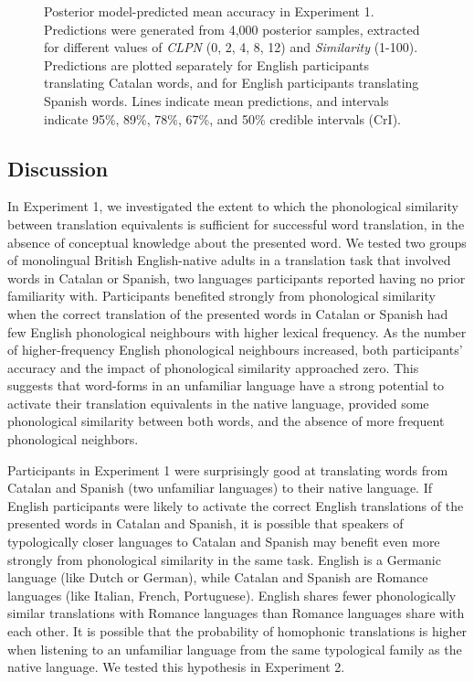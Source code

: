 \documentclass[
  man,
  longtable,
  nolmodern,
  notxfonts,
  notimes,
  colorlinks=true,linkcolor=blue,citecolor=blue,urlcolor=blue]{apa7}
\makeatletter
\newcommand*\pandocbounded[1]{%
  \sbox\pandoc@box{#1}%
  \Gscale@div\@tempa{\textheight}{\dimexpr\ht\pandoc@box+\dp\pandoc@box\relax}%
  \Gscale@div\@tempb{\linewidth}{\wd\pandoc@box}%
  \ifdim\@tempb\p@<\@tempa\p@\let\@tempa\@tempb\fi%
  \ifdim\@tempa\p@<\p@\scalebox{\@tempa}{\usebox\pandoc@box}%
  \else\usebox{\pandoc@box}%
  \fi%
}
\makeatother
\begin{document}
\begin{figure}

\caption{\label{fig-epreds-1}Posterior model-predicted mean accuracy in
Experiment 1. Predictions were generated from 4,000 posterior samples,
extracted for different values of \emph{CLPN} (0, 2, 4, 8, 12) and
\emph{Similarity} (1-100). Predictions are plotted separately for
English participants translating Catalan words, and for English
participants translating Spanish words. Lines indicate mean predictions,
and intervals indicate 95\%, 89\%, 78\%, 67\%, and 50\% credible
intervals (CrI).}

\centering{

\pandocbounded{\texttt{[image: manuscript\_files/figure-pdf/fig-epreds-1-1.pdf]}}

}

\end{figure}%

\subsection{Discussion}\label{discussion}

In Experiment 1, we investigated the extent to which the phonological
similarity between translation equivalents is sufficient for successful
word translation, in the absence of conceptual knowledge about the
presented word. We tested two groups of monolingual British
English-native adults in a translation task that involved words in
Catalan or Spanish, two languages participants reported having no prior
familiarity with. Participants benefited strongly from phonological
similarity when the correct translation of the presented words in
Catalan or Spanish had few English phonological neighbours with higher
lexical frequency. As the number of higher-frequency English
phonological neighbours increased, both participants' accuracy and the
impact of phonological similarity approached zero. This suggests that
word-forms in an unfamiliar language have a strong potential to activate
their translation equivalents in the native language, provided some
phonological similarity between both words, and the absence of more
frequent phonological neighbors.

Participants in Experiment 1 were surprisingly good at translating words
from Catalan and Spanish (two unfamiliar languages) to their native
language. If English participants were likely to activate the correct
English translations of the presented words in Catalan and Spanish, it
is possible that speakers of typologically closer languages to Catalan
and Spanish may benefit even more strongly from phonological similarity
in the same task. English is a Germanic language (like Dutch or German),
while Catalan and Spanish are Romance languages (like Italian, French,
Portuguese). English shares fewer phonologically similar translations
with Romance languages than Romance languages share with each other. It
is possible that the probability of homophonic translations is higher
when listening to an unfamiliar language from the same typological
family as the native language. We tested this hypothesis in Experiment
2.
\end{document}
